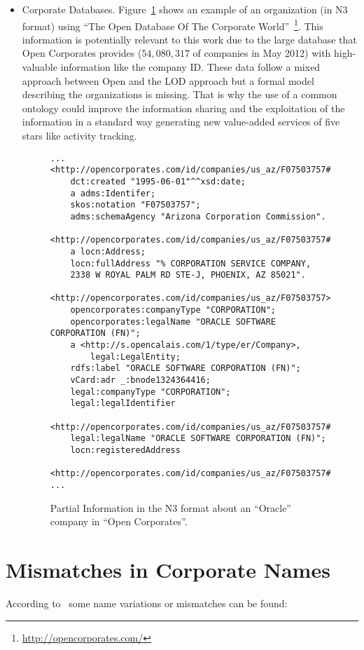 \documentclass{llncs}
\begin{document}
\begin{itemize}
 
 \item Corporate Databases. Figure~\ref{figure:open} shows an example of an organization (in N3 format) using ``The Open Database Of The Corporate World''~\footnote{\url{http://opencorporates.com/}}. 
 This information is potentially relevant to this work due to the large database that Open Corporates provides ($54,080,317$ of companies in May 2012) 
 with high-valuable information like the company ID. These data follow a mixed approach between Open and the LOD approach but a formal 
 model describing the organizations is missing. That is why the use of a common ontology could improve the information sharing and 
 the exploitation of the information in a standard way generating new value-added services of five stars like activity tracking. 

\begin{figure}[!h]
\begin{center}
\begin{lstlisting}[language=SPARQL]
...
<http://opencorporates.com/id/companies/us_az/F07503757#id> 
	dct:created "1995-06-01"^^xsd:date;
	a adms:Identifer;
	skos:notation "F07503757";
	adms:schemaAgency "Arizona Corporation Commission".

<http://opencorporates.com/id/companies/us_az/F07503757#ra> 
	a locn:Address;
	locn:fullAddress "% CORPORATION SERVICE COMPANY, 
	2338 W ROYAL PALM RD STE-J, PHOENIX, AZ 85021".

<http://opencorporates.com/id/companies/us_az/F07503757> 
	opencorporates:companyType "CORPORATION";
	opencorporates:legalName "ORACLE SOFTWARE CORPORATION (FN)";
	a <http://s.opencalais.com/1/type/er/Company>,
		legal:LegalEntity;
	rdfs:label "ORACLE SOFTWARE CORPORATION (FN)";
	vCard:adr _:bnode1324364416;
	legal:companyType "CORPORATION";
	legal:legalIdentifier 
	  <http://opencorporates.com/id/companies/us_az/F07503757#id>;
	legal:legalName "ORACLE SOFTWARE CORPORATION (FN)";
	locn:registeredAddress 
	  <http://opencorporates.com/id/companies/us_az/F07503757#ra>.
...
\end{lstlisting}
\caption{Partial Information in the N3 format about an ``Oracle'' company in ``Open Corporates''.}
\label{figure:open}
\end{center}
\end{figure}
 
 
\end{itemize}


\section{Mismatches in Corporate Names}
According to~\cite{Galvez2006,Morillo:2013:TAA:2424697.2424727} some name variations or mismatches can be found:
\end{document}
